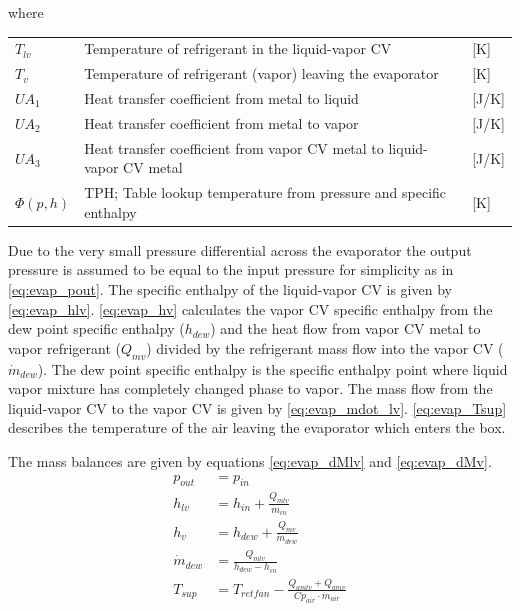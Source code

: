 where
\smallskip
\begin{center}
	\begin{tabular}{l p{10cm} l}
		$T_{lv}$    & Temperature of refrigerant in the liquid-vapor CV                      & [\si{K}]        \\
		$T_{v}$     & Temperature of refrigerant (vapor) leaving the evaporator              & [\si{K}]        \\
		$UA_1$      & Heat transfer coefficient from metal to liquid                         & [\si{J}/\si{K}] \\
		$UA_2$      & Heat transfer coefficient from metal to vapor                          & [\si{J}/\si{K}] \\
		$UA_3$      & Heat transfer coefficient from vapor CV metal to liquid-vapor CV metal & [\si{J}/\si{K}] \\
		$\Phi(p,h)$ & TPH; Table lookup temperature from pressure and specific enthalpy               & [\si{K}]
	\end{tabular}
\end{center}

\medskip
Due to the very small pressure differential across the evaporator the output pressure is assumed to be equal to the input pressure for simplicity as in \cref{eq:evap_pout}. The specific enthalpy of the liquid-vapor CV is given by \cref{eq:evap_hlv}. \cref{eq:evap_hv} calculates the vapor CV specific enthalpy from the dew point specific enthalpy ($h_{dew}$) and the heat flow from vapor CV metal to vapor refrigerant ($Q_{mv}$) divided by the refrigerant mass flow into the vapor CV ($\dot{m}_{dew}$). The dew point specific enthalpy is the specific enthalpy point where liquid vapor mixture has completely changed phase to vapor. The mass flow from the liquid-vapor CV to the vapor CV is given by \cref{eq:evap_mdot_lv}. \cref{eq:evap_Tsup} describes the temperature of the air leaving the evaporator which enters the box.

The mass balances are given by equations \cref{eq:evap_dMlv} and \cref{eq:evap_dMv}.
\begin{align}
	p_{out}       & = p_{in} \label{eq:evap_pout}                                                                \\
	h_{lv}        & = h_{in} + \frac{Q_{mlv}}{\dot{m}_{in}} \label{eq:evap_hlv}                                  \\
	h_v           & = h_{dew} + \frac{Q_{mv}}{\dot{m}_{dew}} \label{eq:evap_hv}                                  \\
	\dot{m}_{dew} & = \frac{Q_{mlv}}{h_{dew} - h_{in}} \label{eq:evap_mdot_lv}                                 \\
	T_{sup}       & = T_{retfan} -  \frac{Q_{amlv} + Q_{amv}}{Cp_{air} \cdot \dot{m}_{air}} \label{eq:evap_Tsup}
\end{align}

